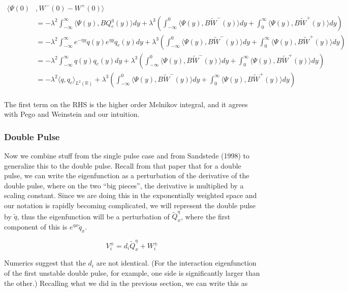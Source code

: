 \documentclass[12pt]{article}
\def\R{{\mathbb R}}
\begin{document}
\begin{align*}
\langle\Psi(0) &, W^-(0) - W^+(0)\rangle \\
&= -\lambda^2 \int_{-\infty}^\infty \langle \Psi(y), B Q^\eta_c(y) \rangle dy + \lambda^3 \left( \int_{-\infty}^0 \langle \Psi(y), B \tilde{W}^-(y) \rangle dy + \int_0^\infty \langle \Psi(y), B \tilde{W}^+(y) \rangle dy \right) \\
&= -\lambda^2 \int_{-\infty}^\infty e^{-\eta y}q(y) e^{\eta y} q_c(y) dy + \lambda^3 \left( \int_{-\infty}^0 \langle \Psi(y), B \tilde{W}^-(y) \rangle dy + \int_0^\infty \langle \Psi(y), B \tilde{W}^+(y) \rangle dy \right) \\
&= -\lambda^2 \int_{-\infty}^\infty q(y) q_c(y) dy + \lambda^3 \left( \int_{-\infty}^0 \langle \Psi(y), B \tilde{W}^-(y) \rangle dy + \int_0^\infty \langle \Psi(y), B \tilde{W}^+(y) \rangle dy \right) \\
&= -\lambda^2 \langle q, q_c \rangle_{L^2(\R)} + \lambda^3 \left( \int_{-\infty}^0 \langle \Psi(y), B \tilde{W}^-(y) \rangle dy + \int_0^\infty \langle \Psi(y), B \tilde{W}^+(y) \rangle dy \right) \\
\end{align*}

The first term on the RHS is the higher order Melnikov integral, and it agrees with Pego and Weinstein and our intuition.

\subsubsection*{Double Pulse}

Now we combine stuff from the single pulse case and from Sandstede (1998) to generalize this to the double pulse. Recall from that paper that for a double pulse, we can write the eigenfunction as a perturbation of the derivative of the double pulse, where on the two ``big pieces'', the derivative is multiplied by a scaling constant. Since we are doing this in the exponentially weighted space and our notation is rapidly becoming complicated, we will represent the double pulse by $\tilde{q}$, thus the eigenfunction will be a perturbation of $\tilde{Q}^\eta_x$, where the first component of this is $e^{\eta x} \tilde{q}_x$.

\[
V_i^\pm = d_i \tilde{Q}^\eta_x + W_i^\pm 
\]

Numerics suggest that the $d_i$ are not identical. (For the interaction eigenfunction of the first unstable double pulse, for example, one side is significantly larger than the other.) Recalling what we did in the previous section, we can write this as
\end{document}
